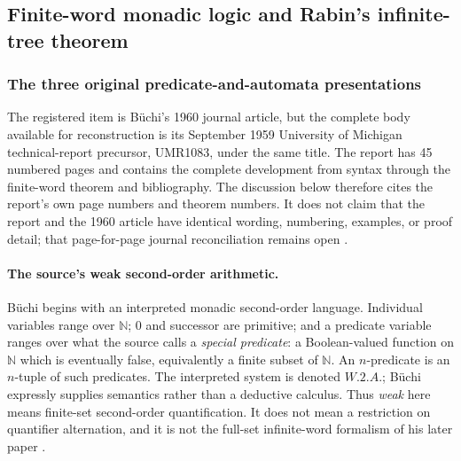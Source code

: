 
\subsection{Finite-word monadic logic and Rabin's infinite-tree theorem}
\label{sec:p09-presentation-n-c-014}

\subsubsection{The three original predicate-and-automata presentations}

The registered item is B\"uchi's 1960 journal article, but the complete body
available for reconstruction is its September 1959 University of Michigan
technical-report precursor, UMR1083, under the same title.  The report has 45
numbered pages and contains the complete development from syntax through the
finite-word theorem and bibliography.  The discussion below therefore cites
the report's own page numbers and theorem numbers.  It does not claim that the
report and the 1960 article have identical wording, numbering, examples, or
proof detail; that page-for-page journal reconciliation remains open
\cite{Buchi1959WeakReport,Buchi1960}.

\paragraph{The source's weak second-order arithmetic.}
B\"uchi begins with an interpreted monadic second-order language.  Individual
variables range over \(\mathbb N\); \(0\) and successor are primitive; and a
predicate variable ranges over what the source calls a \emph{special
predicate}: a Boolean-valued function on \(\mathbb N\) which is eventually
false, equivalently a finite subset of \(\mathbb N\).  An \(n\)-predicate is
an \(n\)-tuple of such predicates.  The interpreted system is denoted
\(W.2.A.\); B\"uchi expressly supplies semantics rather than a deductive
calculus.  Thus \emph{weak} here means finite-set second-order quantification.
It does not mean a restriction on quantifier alternation, and it is not the
full-set infinite-word formalism of his later paper
\cite[pp.~2--6]{Buchi1959WeakReport}.

